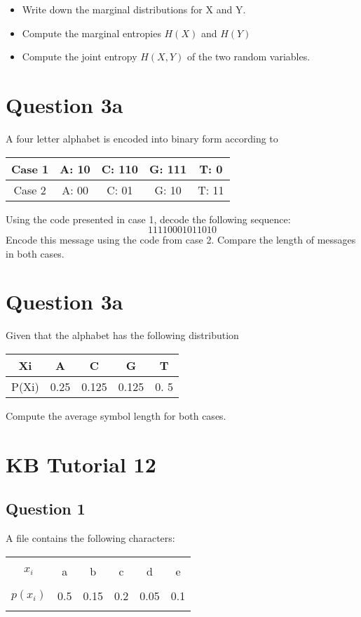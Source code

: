 \documentclass[a4paper,12pt]{article}
\begin{document}
\begin{itemize}
\item Write down the marginal distributions for X and Y.

\item Compute the marginal entropies $H(X)$ and $H(Y)$

\item Compute the joint entropy $H(X,Y)$ of the two random variables.
\end{itemize}
\section*{Question 3a}
A four letter alphabet is encoded into binary form according to
\begin{tabular}{|c|c|c|c|c|}
\hline
Case 1	&	A:  10 	&	C:  110	&	G:  111	& T:  0 \\ \hline
Case 2	&	A:  00	&	C:  01	&		G: 10	&	T: 11 \\ \hline
\end{tabular} 
	

Using the code presented in case 1, decode the following sequence:	
\[11110001011010\]
Encode this message using the code from case 2. Compare the length of messages in both cases.

\section*{Question 3a}
Given that the alphabet has the following distribution 
\begin{tabular}{|c|c|c|c|c|}
\hline
Xi & A & C & G & T \\ \hline
P(Xi) & 0.25 & 0.125 & 0.125 & 0. 5 \\
\hline
\end{tabular} 

Compute the average symbol length for both cases.



\section{KB Tutorial 12}


\subsection*{Question 1}

A file contains the following characters:\\[-0.1cm]
\begin{center}
	\begin{tabular}{|c|ccccc|}
		\hline
		&&&&& \\[-0.4cm]
		$x_i$     & a & b & c & d & e \\[0.1cm]
		\hline
		&&&&& \\[-0.4cm]
		$p(x_i)$  & 0.5 & 0.15 & 0.2 & 0.05 & 0.1 \\[0.1cm]
		\hline
		\multicolumn{6}{c}{}\\[-0.2cm]
	\end{tabular}
\end{center}
\end{document}
